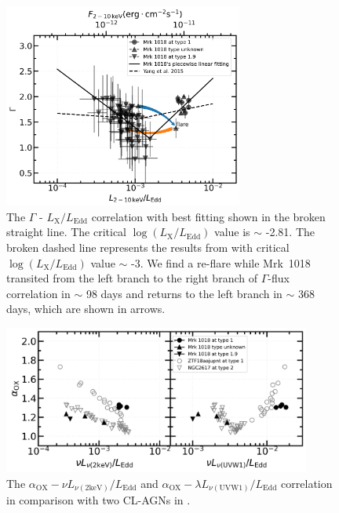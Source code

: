 \documentclass[twocolumn]{aastex63}
\begin{document}
\begin{figure}
\centering
	\includegraphics[width=0.7\textwidth]{./pic/xrayappendgood-errorbar-Lrate-g-tmap_brokenlinear_dot.png}
    \caption{The $\Gamma$ - $L_\mathrm{X}/L_\mathrm{Edd}$ correlation with best fitting shown in the broken straight line. The critical $\log(L_\mathrm{X}/L_\mathrm{Edd})$ value is $\sim$ -2.81. The broken dashed line represents the results from \citet{2015MNRAS.447.1692Y} with critical $\log(L_\mathrm{X}/L_\mathrm{Edd})$ value $\sim$ -3. We find a re-flare while Mrk~1018 transited from the left branch to the right branch of $\Gamma$-flux correlation in $\sim$ 98 days and returns to the left branch in $\sim$ 368 days, which are shown in arrows.}
    \label{fig:xrayappendgood-Lrateandg-tmap}
\end{figure}




\begin{figure}
\centering
	\includegraphics[width=0.9\textwidth]{./pic/Mrk1018_subplots_plus_2individuals_alpha_ox_L_x_Luv_rate.png}
    \caption{The $\alpha_\mathrm{OX}-\nu L_{\nu (\mathrm{2keV})}/L_\mathrm{Edd}$ and $\alpha_\mathrm{OX}-\lambda L_{\nu (\mathrm{UVW1})}/L_\mathrm{Edd}$ correlation in comparison with two CL-AGNs in \citet{2019arXiv190904676R}.}   
    \label{fig:alpha_ox_lx_luv}
\end{figure}
\end{document}
